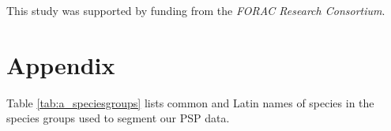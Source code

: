 \documentclass{article}
\begin{document}
This study was supported by funding from the \emph{FORAC Research Consortium}.

\begin{nolinenumbers}


\end{nolinenumbers}

\section*{Appendix}

Table \ref{tab:a_speciesgroups} lists common and Latin names of species in the species groups used to segment our PSP data.
\end{document}
